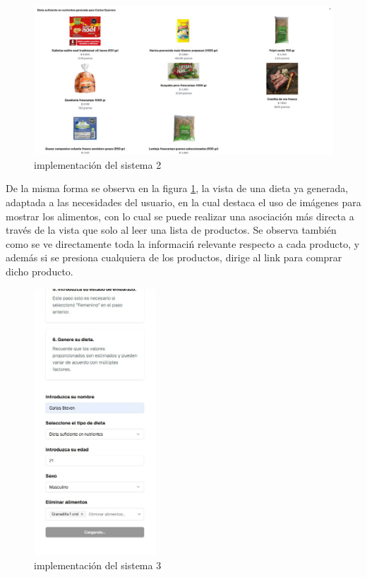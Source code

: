 \begin{figure}[H]
    \centering
    \includegraphics[width=15cm]{img/implementacion/implementacion5.jpeg}
    \caption{implementaci\'on del sistema 2}
    \label{fig:implementacion2}
\end{figure}

De la misma forma se observa en la figura \ref{fig:implementacion2}, la vista de una dieta ya generada, adaptada a las necesidades del usuario, en la cual destaca el uso de im\'agenes para mostrar los alimentos, con lo cual se puede realizar una asociaci\'on m\'as directa a trav\'es de la vista que  solo al leer una lista de productos. Se observa tambi\'en como se ve directamente toda la informaci\'n relevante respecto a cada producto, y adem\'as si se presiona cualquiera de los productos, dirige al link para comprar dicho producto.


\begin{figure}[H]
    \centering
    \includegraphics[height=10cm]{img/implementacion/implementacion4.jpeg}
    \caption{implementaci\'on del sistema 3}
    \label{fig:implementacion3}
\end{figure}

